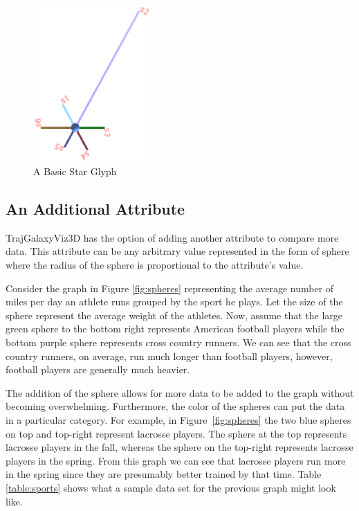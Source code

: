 \documentclass[]{article}
\begin{document}
\begin{figure}[htb]
\begin{center}
\includegraphics[width=0.4\textwidth, keepaspectratio=true]{images/basicStarGlyph}
\end{center}
\caption{A Basic Star Glyph}
\label {fig:basicGlyph}
\end{figure}

\subsection{An Additional Attribute}
\label{ss:additional_attribute}

TrajGalaxyViz3D has the option of adding another attribute to compare more data. This attribute can be any arbitrary value represented in the form of sphere where the radius of the sphere is proportional to the attribute's value.

Consider the graph in Figure \ref{fig:spheres} representing the average number of miles per day an athlete runs grouped by the sport he plays.  Let the size of the sphere represent the average weight of the athletes.  Now, assume that the large green sphere to the bottom right represents American football players while the bottom purple sphere represents cross country runners.  We can see that the cross country runners, on average, run much longer than football players, however, football players are generally much heavier.

The addition of the sphere allows for more data to be added to the graph without becoming overwhelming. Furthermore, the color of the spheres can put the data in a particular category. For example, in Figure~\ref{fig:spheres} the two blue spheres on top and top-right represent lacrosse players. The sphere at the top represents lacrosse players in the fall, whereas the sphere on the top-right represents lacrosse players in the spring. From this graph we can see that lacrosse players run more in the spring since they are presumably better trained by that time. Table \ref{table:sports} shows what a sample data set for the previous graph might look like.
\end{document}
